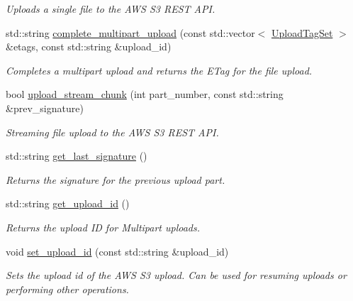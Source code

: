 \begin{DoxyCompactItemize}
\begin{DoxyCompactList}\small\item\em Uploads a single file to the A\+WS S3 R\+E\+ST A\+PI. \end{DoxyCompactList}\item 
std\+::string \hyperlink{class_vessel_1_1_networking_1_1_aws_s3_client_add76f620364375f1a54730175e869de9}{complete\+\_\+multipart\+\_\+upload} (const std\+::vector$<$ \hyperlink{struct_vessel_1_1_types_1_1_upload_tag_set}{Upload\+Tag\+Set} $>$ \&etags, const std\+::string \&upload\+\_\+id)
\begin{DoxyCompactList}\small\item\em Completes a multipart upload and returns the E\+Tag for the file upload. \end{DoxyCompactList}\item 
bool \hyperlink{class_vessel_1_1_networking_1_1_aws_s3_client_aa5d5c62b27ceb78262a33d835abaa8be}{upload\+\_\+stream\+\_\+chunk} (int part\+\_\+number, const std\+::string \&prev\+\_\+signature)
\begin{DoxyCompactList}\small\item\em Streaming file upload to the A\+WS S3 R\+E\+ST A\+PI. \end{DoxyCompactList}\item 
std\+::string \hyperlink{class_vessel_1_1_networking_1_1_aws_s3_client_ad606a5dd675054cbf1598d662ff90443}{get\+\_\+last\+\_\+signature} ()
\begin{DoxyCompactList}\small\item\em Returns the signature for the previous upload part. \end{DoxyCompactList}\item 
std\+::string \hyperlink{class_vessel_1_1_networking_1_1_aws_s3_client_af255a5ea67ccd234e90518d149737603}{get\+\_\+upload\+\_\+id} ()
\begin{DoxyCompactList}\small\item\em Returns the upload ID for Multipart uploads. \end{DoxyCompactList}\item 
\mbox{\label{class_vessel_1_1_networking_1_1_aws_s3_client_a71ddd6a81d15eec7e5423cee6d064451}} 
void \hyperlink{class_vessel_1_1_networking_1_1_aws_s3_client_a71ddd6a81d15eec7e5423cee6d064451}{set\+\_\+upload\+\_\+id} (const std\+::string \&upload\+\_\+id)
\begin{DoxyCompactList}\small\item\em Sets the upload id of the A\+WS S3 upload. Can be used for resuming uploads or performing other operations. \end{DoxyCompactList}\item 

\end{DoxyCompactItemize}
